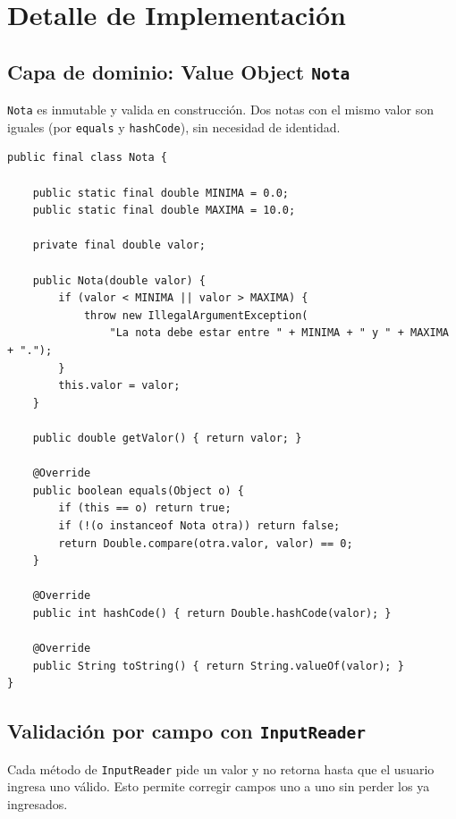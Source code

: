 \documentclass[12pt,a4paper]{article}
\begin{document}

\section{Detalle de Implementación}

\subsection{Capa de dominio: Value Object \texttt{Nota}}

\texttt{Nota} es inmutable y valida en construcción. Dos notas con el
mismo valor son iguales (por \texttt{equals} y \texttt{hashCode}), sin
necesidad de identidad.

\begin{lstlisting}[caption={Nota.java --- value object inmutable.}]
public final class Nota {

    public static final double MINIMA = 0.0;
    public static final double MAXIMA = 10.0;

    private final double valor;

    public Nota(double valor) {
        if (valor < MINIMA || valor > MAXIMA) {
            throw new IllegalArgumentException(
                "La nota debe estar entre " + MINIMA + " y " + MAXIMA + ".");
        }
        this.valor = valor;
    }

    public double getValor() { return valor; }

    @Override
    public boolean equals(Object o) {
        if (this == o) return true;
        if (!(o instanceof Nota otra)) return false;
        return Double.compare(otra.valor, valor) == 0;
    }

    @Override
    public int hashCode() { return Double.hashCode(valor); }

    @Override
    public String toString() { return String.valueOf(valor); }
}
\end{lstlisting}

\subsection{Validación por campo con \texttt{InputReader}}

Cada método de \texttt{InputReader} pide un valor y no retorna hasta que
el usuario ingresa uno válido. Esto permite corregir campos uno a uno sin
perder los ya ingresados.
\end{document}
